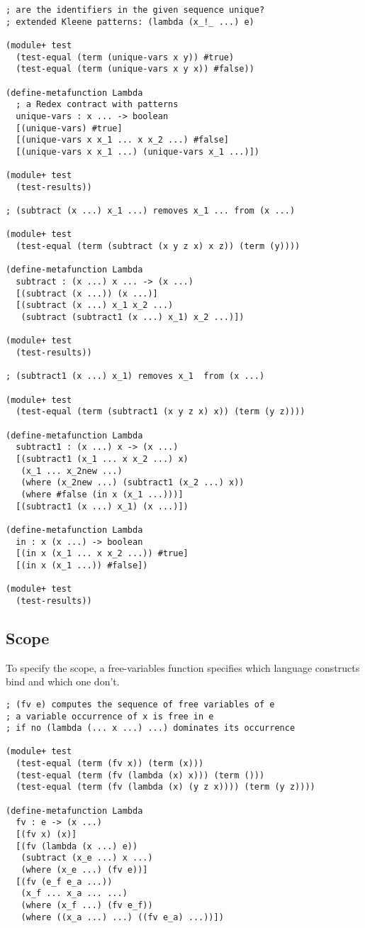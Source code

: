 \begin{lstlisting}[frame=none,numbers=none]
; are the identifiers in the given sequence unique?
; extended Kleene patterns: (lambda (x_!_ ...) e)

(module+ test
  (test-equal (term (unique-vars x y)) #true)
  (test-equal (term (unique-vars x y x)) #false))

(define-metafunction Lambda
  ; a Redex contract with patterns
  unique-vars : x ... -> boolean
  [(unique-vars) #true]
  [(unique-vars x x_1 ... x x_2 ...) #false]
  [(unique-vars x x_1 ...) (unique-vars x_1 ...)])

(module+ test
  (test-results))

; (subtract (x ...) x_1 ...) removes x_1 ... from (x ...)

(module+ test
  (test-equal (term (subtract (x y z x) x z)) (term (y))))

(define-metafunction Lambda
  subtract : (x ...) x ... -> (x ...)
  [(subtract (x ...)) (x ...)]
  [(subtract (x ...) x_1 x_2 ...)
   (subtract (subtract1 (x ...) x_1) x_2 ...)])

(module+ test
  (test-results))

; (subtract1 (x ...) x_1) removes x_1  from (x ...)

(module+ test
  (test-equal (term (subtract1 (x y z x) x)) (term (y z))))

(define-metafunction Lambda
  subtract1 : (x ...) x -> (x ...)
  [(subtract1 (x_1 ... x x_2 ...) x)
   (x_1 ... x_2new ...)
   (where (x_2new ...) (subtract1 (x_2 ...) x))
   (where #false (in x (x_1 ...)))]
  [(subtract1 (x ...) x_1) (x ...)])

(define-metafunction Lambda
  in : x (x ...) -> boolean
  [(in x (x_1 ... x x_2 ...)) #true]
  [(in x (x_1 ...)) #false])

(module+ test
  (test-results))
\end{lstlisting}

\subsection{Scope}

To specify the scope, a free-variables function specifies which language
constructs bind and which one don't.

\begin{lstlisting}[frame=none,numbers=none]
; (fv e) computes the sequence of free variables of e
; a variable occurrence of x is free in e
; if no (lambda (... x ...) ...) dominates its occurrence

(module+ test
  (test-equal (term (fv x)) (term (x)))
  (test-equal (term (fv (lambda (x) x))) (term ()))
  (test-equal (term (fv (lambda (x) (y z x)))) (term (y z))))

(define-metafunction Lambda
  fv : e -> (x ...)
  [(fv x) (x)]
  [(fv (lambda (x ...) e))
   (subtract (x_e ...) x ...)
   (where (x_e ...) (fv e))]
  [(fv (e_f e_a ...))
   (x_f ... x_a ... ...)
   (where (x_f ...) (fv e_f))
   (where ((x_a ...) ...) ((fv e_a) ...))])
\end{lstlisting}

